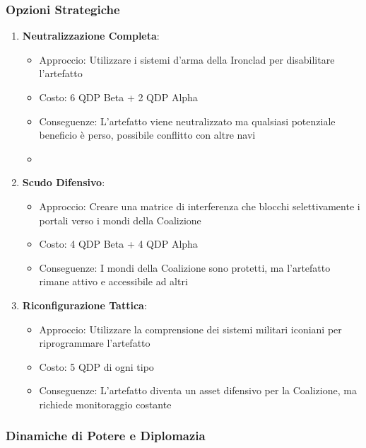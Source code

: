 \documentclass[letterpaper,twocolumn,openany,nodeprecatedcode]{dndbook}
\begin{document}
\subsubsection{Opzioni Strategiche}
\begin{enumerate}
    \item \textbf{Neutralizzazione Completa}:
     \begin{itemize}
     \item Approccio: Utilizzare i sistemi d'arma della Ironclad per disabilitare l'artefatto
     \item Costo: 6 QDP Beta + 2 QDP Alpha
     \item Conseguenze: L'artefatto viene neutralizzato ma qualsiasi potenziale beneficio è perso, possibile conflitto con altre navi
    \item \end{itemize}
     
     
     \item \textbf{Scudo Difensivo}:
     
     \begin{itemize}
     \item Approccio: Creare una matrice di interferenza che blocchi selettivamente i portali verso i mondi della Coalizione
     \item Costo: 4 QDP Beta + 4 QDP Alpha
     \item Conseguenze: I mondi della Coalizione sono protetti, ma l'artefatto rimane attivo e accessibile ad altri
     \end{itemize}
     
     
    \item \textbf{Riconfigurazione Tattica}:
     
     \begin{itemize}
     \item Approccio: Utilizzare la comprensione dei sistemi militari iconiani per riprogrammare l'artefatto
     \item Costo: 5 QDP di ogni tipo
     \item Conseguenze: L'artefatto diventa un asset difensivo per la Coalizione, ma richiede monitoraggio costante
     \end{itemize}
\end{enumerate}



\subsubsection{Dinamiche di Potere e Diplomazia}
\end{document}

